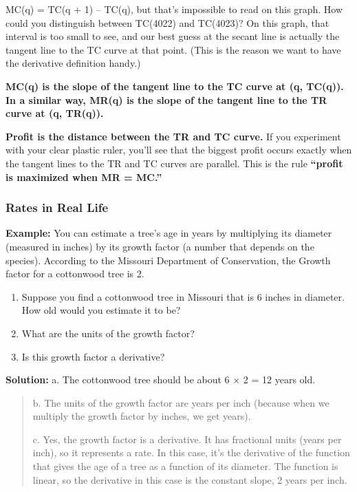 MC(q) = TC(q + 1) -- TC(q), but that's impossible to read on this graph.
How could you distinguish between TC(4022) and TC(4023)? On this graph,
that interval is too small to see, and our best guess at the secant line
is actually the tangent line to the TC curve at that point. (This is the
reason we want to have the derivative definition handy.)

\textbf{MC(q) is the slope of the tangent line to the TC curve at (q,
TC(q)). In a similar way, MR(q) is the slope of the tangent line to the
TR curve at (q, TR(q)).}

\textbf{Profit is the distance between the TR and TC curve.} If you
experiment with your clear plastic ruler, you'll see that the biggest
profit occurs exactly when the tangent lines to the TR and TC curves are
parallel. This is the rule \textbf{``profit is maximized when MR =
MC.''}

\subsubsection{Rates in Real Life}\label{rates-in-real-life}

\textbf{Example:} You can estimate a tree's age in years by multiplying
its diameter (measured in inches) by its growth factor (a number that
depends on the species). According to the Missouri Department of
Conservation, the Growth factor for a cottonwood tree is 2.

\begin{enumerate}
\def\labelenumi{\alph{enumi}.}
\item
  Suppose you find a cottonwood tree in Missouri that is 6 inches in
  diameter. How old would you estimate it to be?
\item
  What are the units of the growth factor?
\item
  Is this growth factor a derivative?
\end{enumerate}

\textbf{Solution:} a. The cottonwood tree should be about 6 × 2 = 12
years old.

\begin{quote}
b. The units of the growth factor are years per inch (because when we
multiply the growth factor by inches, we get years).

c. Yes, the growth factor is a derivative. It has fractional units
(years per inch), so it represents a rate. In this case, it's the
derivative of the function that gives the age of a tree as a function of
its diameter. The function is linear, so the derivative in this case is
the constant slope, 2 years per inch.
\end{quote}

